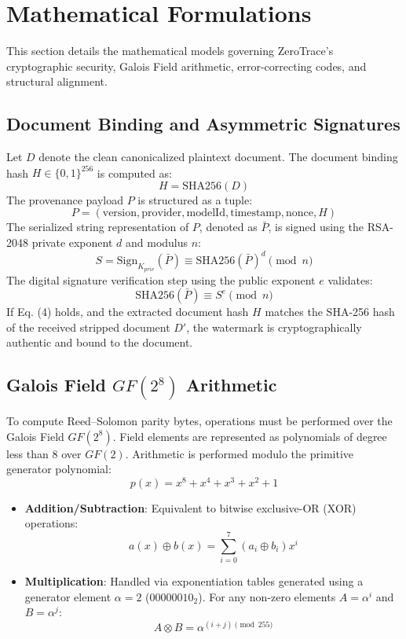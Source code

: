 \documentclass[conference]{IEEEtran}
\begin{document}
\section{Mathematical Formulations}
This section details the mathematical models governing ZeroTrace's cryptographic security, Galois Field arithmetic, error-correcting codes, and structural alignment.

\subsection{Document Binding and Asymmetric Signatures}
Let $D$ denote the clean canonicalized plaintext document. The document binding hash $H \in \{0, 1\}^{256}$ is computed as:
\begin{equation}
H = \text{SHA256}(D)
\end{equation}
The provenance payload $P$ is structured as a tuple:
\begin{equation}
P = (\text{version}, \text{provider}, \text{modelId}, \text{timestamp}, \text{nonce}, H)
\end{equation}
The serialized string representation of $P$, denoted as $\bar{P}$, is signed using the RSA-2048 private exponent $d$ and modulus $n$:
\begin{equation}
S = \text{Sign}_{K_{priv}}(\bar{P}) \equiv \text{SHA256}(\bar{P})^d \pmod n
\end{equation}
The digital signature verification step using the public exponent $e$ validates:
\begin{equation}
\text{SHA256}(\bar{P}) \equiv S^e \pmod n
\end{equation}
If Eq. (4) holds, and the extracted document hash $H$ matches the SHA-256 hash of the received stripped document $D'$, the watermark is cryptographically authentic and bound to the document.

\subsection{Galois Field $GF(2^8)$ Arithmetic}
To compute Reed--Solomon parity bytes, operations must be performed over the Galois Field $GF(2^8)$. Field elements are represented as polynomials of degree less than 8 over $GF(2)$. Arithmetic is performed modulo the primitive generator polynomial:
\begin{equation}
p(x) = x^8 + x^4 + x^3 + x^2 + 1
\end{equation}
\begin{itemize}
    \item \textbf{Addition/Subtraction}: Equivalent to bitwise exclusive-OR (XOR) operations:
    \begin{equation}
    a(x) \oplus b(x) = \sum_{i=0}^{7} (a_i \oplus b_i) x^i
    \end{equation}
    \item \textbf{Multiplication}: Handled via exponentiation tables generated using a generator element $\alpha = 2$ ($00000010_2$). For any non-zero elements $A = \alpha^i$ and $B = \alpha^j$:
    \begin{equation}
    A \otimes B = \alpha^{(i+j) \pmod{255}}
    \end{equation}
\end{itemize}
\end{document}
